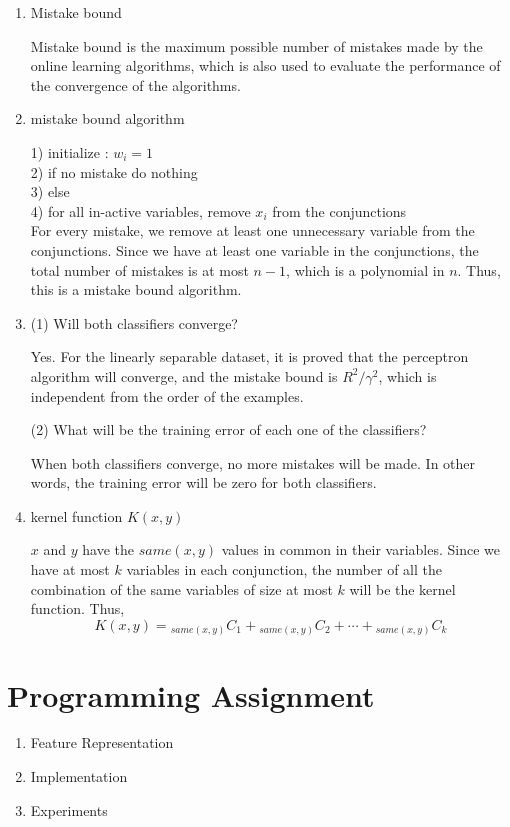 \begin{enumerate}
\item Mistake bound

Mistake bound is the maximum possible number of mistakes made by the online learning algorithms, which is also used to evaluate the performance of the convergence of the algorithms. 

\item mistake bound algorithm

1) initialize : $w_i = 1$ \\
2) if no mistake do nothing \\
3) else \\
4)    for all in-active variables, remove $x_i$ from the conjunctions \\ 

For every mistake, we remove at least one unnecessary variable from the conjunctions. Since we have at least one variable in the conjunctions, the total number of mistakes is at most $n-1$, which is a polynomial in $n$. Thus, this  is a mistake bound algorithm.

\item 

(1) Will both classifiers converge?

Yes. For the linearly separable dataset, it is proved that the perceptron algorithm will converge, and the mistake bound is $R^2/\gamma^2$, which is independent from the order of the examples.

(2) What will be the training error of each one of the classifiers?

When both classifiers converge, no more mistakes will be made. In other words, the training error will be zero for both classifiers.

\item kernel function $K(x, y)$

$x$ and $y$ have the $same(x,y)$ values in common in their variables. Since we have at most $k$ variables in each conjunction, the number of all the combination of the same variables of size at most $k$ will be the kernel function. Thus,
\[
K(x, y)={}_{same(x,y)} C _1 + {}_{same(x,y)} C _2 + \cdots + {}_{same(x,y)} C _k
\]

\end{enumerate}

\section{Programming Assignment}
\begin{enumerate}
\item Feature Representation

\item Implementation


\item Experiments


\end{enumerate}




